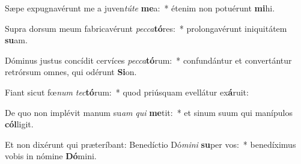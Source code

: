 \item Sæpe expugnavérunt me a juven\textit{tú}\textit{te} \textbf{me}a:~* étenim non potuérunt \textbf{mi}hi.
\item Supra dorsum meum fabricavérunt \textit{pec}\textit{ca}\textbf{tó}res:~* prolongavérunt iniquitátem \textbf{su}am.
\item Dóminus justus concídit cervíces \textit{pec}\textit{ca}\textbf{tó}rum:~* confundántur et convertántur retrórsum omnes, qui odérunt \textbf{Si}on.
\item Fiant sicut fœ\textit{num} \textit{tec}\textbf{tó}rum:~* quod priúsquam evellátur ex\textbf{á}ruit:
\item De quo non implévit manum su\textit{am} \textit{qui} \textbf{me}tit:~* et sinum suum qui manípulos \textbf{cól}ligit.
\item Et non dixérunt qui præteríbant: Benedíctio Dó\textit{mi}\textit{ni} \textbf{su}per vos:~* benedíximus vobis in nómine \textbf{Dó}mini.
